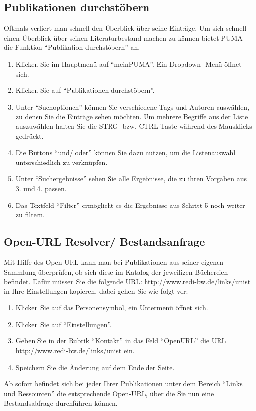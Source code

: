 \subsection{Publikationen durchstöbern}
Oftmals verliert man schnell den Überblick über seine Einträge. Um sich schnell einen Überblick über seinen Literaturbestand machen zu können bietet PUMA die Funktion \enquote{Publikation durchstöbern} an. 
\begin{enumerate}
    \item Klicken Sie im Hauptmenü auf \enquote{meinPUMA}. Ein Dropdown- Menü öffnet sich.
    \item Klicken Sie auf \enquote{Publikationen durchstöbern}.
    \item Unter \enquote{Suchoptionen} können Sie verschiedene Tags und Autoren auswählen, zu denen Sie die Einträge sehen möchten. Um mehrere Begriffe aus der Liste auszuwählen halten Sie die STRG- bzw. CTRL-Taste während des Mausklicks gedrückt.
    \item Die Buttons \enquote{und/ oder} können Sie dazu nutzen, um die Listenauswahl unterschiedlich zu verknüpfen. 
    \item Unter \enquote{Suchergebnisse} sehen Sie alle Ergebnisse, die zu ihren Vorgaben aus 3. und 4. passen.
    \item Das Textfeld \enquote{Filter} ermöglicht es die Ergebnisse aus Schritt 5 noch weiter zu filtern.
\end{enumerate}

\subsection{Open-URL Resolver/ Bestandsanfrage}
Mit Hilfe des Open-URL kann man bei Publikationen aus seiner eigenen Sammlung überprüfen, ob sich diese im Katalog der jeweiligen Büchereien befindet. Dafür müssen Sie  die folgende URL:  
\url{http://www.redi-bw.de/links/unist} in Ihre Einstellungen kopieren, dabei gehen Sie wie folgt vor:
\begin{enumerate}
    \item Klicken Sie auf das Personensymbol, ein Untermenü öffnet sich.
    \item Klicken Sie auf \enquote{Einstellungen}.
    \item Geben Sie in der Rubrik \enquote{Kontakt} in das Feld \enquote{OpenURL} die URL \url{http://www.redi-bw.de/links/unist} ein. 
    \item Speichern Sie die Änderung auf dem Ende der Seite.
\end{enumerate}
Ab sofort befindet sich bei jeder Ihrer Publikationen unter dem Bereich \enquote{Links und Ressourcen} die entsprechende Open-URL, über die Sie nun eine Bestandsabfrage durchführen können.
